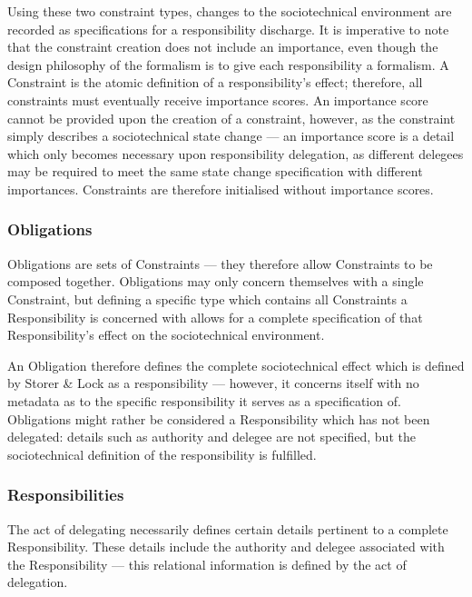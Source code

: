 Using these two constraint types, changes to the sociotechnical environment are recorded as specifications for a responsibility discharge. It is imperative to note that the constraint creation does not include an importance, even though the design philosophy of the formalism is to give each responsibility a formalism. A Constraint is the atomic definition of a responsibility's effect; therefore, all constraints must eventually receive importance scores. An importance score cannot be provided upon the creation of a constraint, however, as the constraint simply describes a sociotechnical state change --- an importance score is a detail which only becomes necessary upon responsibility delegation, as different delegees may be required to meet the same state change specification with different importances. Constraints are therefore initialised without importance scores.\par

\subsubsection{Obligations}  %
Obligations are sets of Constraints --- they therefore allow Constraints to be composed together. Obligations may only concern themselves with a single Constraint, but defining a specific type which contains all Constraints a Responsibility is concerned with allows for a complete specification of that Responsibility's effect on the sociotechnical environment.\par

An Obligation therefore defines the complete sociotechnical effect which is defined by Storer \& Lock as a responsibility --- however, it concerns itself with no metadata as to the specific responsibility it serves as a specification of. Obligations might rather be considered a Responsibility which has not been delegated: details such as authority and delegee are not specified, but the sociotechnical definition of the responsibility is fulfilled.\par

\subsubsection{Responsibilities}  %
The act of delegating necessarily defines certain details pertinent to a complete Responsibility. These details include the authority and delegee associated with the Responsibility --- this relational information is defined by the act of delegation.\par

